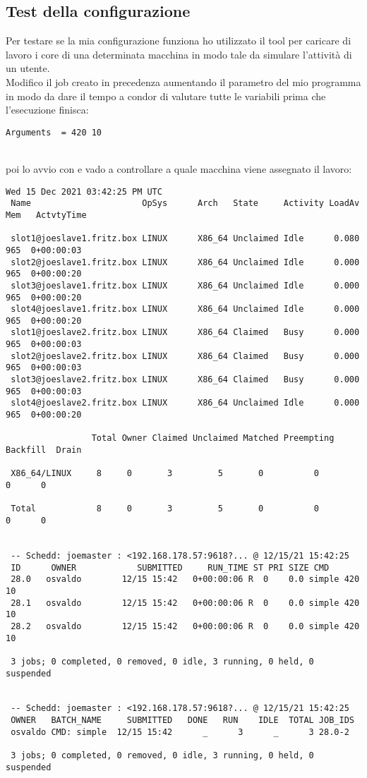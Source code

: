 \subsection{Test della configurazione}

Per testare se la mia configurazione funziona ho utilizzato il tool  per caricare di lavoro i core di una determinata macchina in modo tale da simulare l'attivit\`{a} di un utente.\\
Modifico il job creato in precedenza aumentando il parametro  del mio programma in modo da dare il tempo a condor di valutare tutte le variabili prima che l'esecuzione finisca: 

\begin{lstlisting}[style=cmd]
  Arguments  = 420 10
\end{lstlisting}
\ \\
poi lo avvio con  e vado a controllare a quale macchina viene assegnato il lavoro:
\pagebreak
\begin{lstlisting}[style=output_tiny]
  Wed 15 Dec 2021 03:42:25 PM UTC
 Name                      OpSys      Arch   State     Activity LoadAv Mem   ActvtyTime
 
 slot1@joeslave1.fritz.box LINUX      X86_64 Unclaimed Idle      0.080  965  0+00:00:03
 slot2@joeslave1.fritz.box LINUX      X86_64 Unclaimed Idle      0.000  965  0+00:00:20
 slot3@joeslave1.fritz.box LINUX      X86_64 Unclaimed Idle      0.000  965  0+00:00:20
 slot4@joeslave1.fritz.box LINUX      X86_64 Unclaimed Idle      0.000  965  0+00:00:20
 slot1@joeslave2.fritz.box LINUX      X86_64 Claimed   Busy      0.000  965  0+00:00:03
 slot2@joeslave2.fritz.box LINUX      X86_64 Claimed   Busy      0.000  965  0+00:00:03
 slot3@joeslave2.fritz.box LINUX      X86_64 Claimed   Busy      0.000  965  0+00:00:03
 slot4@joeslave2.fritz.box LINUX      X86_64 Unclaimed Idle      0.000  965  0+00:00:20
 
                 Total Owner Claimed Unclaimed Matched Preempting Backfill  Drain
 
 X86_64/LINUX     8     0       3         5       0          0        0      0
 
 Total            8     0       3         5       0          0        0      0
 
 
 -- Schedd: joemaster : <192.168.178.57:9618?... @ 12/15/21 15:42:25
 ID      OWNER            SUBMITTED     RUN_TIME ST PRI SIZE CMD
 28.0   osvaldo        12/15 15:42   0+00:00:06 R  0    0.0 simple 420 10
 28.1   osvaldo        12/15 15:42   0+00:00:06 R  0    0.0 simple 420 10
 28.2   osvaldo        12/15 15:42   0+00:00:06 R  0    0.0 simple 420 10
 
 3 jobs; 0 completed, 0 removed, 0 idle, 3 running, 0 held, 0 suspended
 
 
 -- Schedd: joemaster : <192.168.178.57:9618?... @ 12/15/21 15:42:25
 OWNER   BATCH_NAME     SUBMITTED   DONE   RUN    IDLE  TOTAL JOB_IDS
 osvaldo CMD: simple  12/15 15:42      _      3      _      3 28.0-2
 
 3 jobs; 0 completed, 0 removed, 0 idle, 3 running, 0 held, 0 suspended
 
\end{lstlisting}
